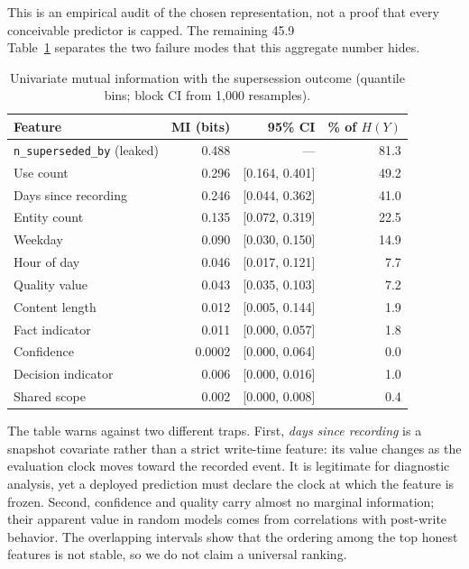 \documentclass[sigconf,nonacm]{acmart}
\begin{document}
This is an empirical audit of the chosen representation, not a proof that every conceivable predictor is capped. The remaining 45.9\\%
Table~\ref{tab:feature-mi} separates the two failure modes that this aggregate number hides.

\begin{table}[h]
\centering
\caption{Univariate mutual information with the supersession outcome (quantile bins; block CI from 1,000 resamples).}
\label{tab:feature-mi}
\begin{tabular}{lrrr}
\toprule
Feature & MI (bits) & 95\% CI & \% of $H(Y)$ \\
\midrule
\texttt{n\_superseded\_by} (leaked) & 0.488 & --- & 81.3 \\
Use count & 0.296 & [0.164, 0.401] & 49.2 \\
Days since recording & 0.246 & [0.044, 0.362] & 41.0 \\
Entity count & 0.135 & [0.072, 0.319] & 22.5 \\
Weekday & 0.090 & [0.030, 0.150] & 14.9 \\
Hour of day & 0.046 & [0.017, 0.121] & 7.7 \\
Quality value & 0.043 & [0.035, 0.103] & 7.2 \\
Content length & 0.012 & [0.005, 0.144] & 1.9 \\
Fact indicator & 0.011 & [0.000, 0.057] & 1.8 \\
Confidence & 0.0002 & [0.000, 0.064] & 0.0 \\
Decision indicator & 0.006 & [0.000, 0.016] & 1.0 \\
Shared scope & 0.002 & [0.000, 0.008] & 0.4 \\
\bottomrule
\end{tabular}
\end{table}

The table warns against two different traps. First, \emph{days since recording} is a snapshot covariate rather than a strict write-time feature: its value changes as the evaluation clock moves toward the recorded event. It is legitimate for diagnostic analysis, yet a deployed prediction must declare the clock at which the feature is frozen. Second, confidence and quality carry almost no marginal information; their apparent value in random models comes from correlations with post-write behavior. The overlapping intervals show that the ordering among the top honest features is not stable, so we do not claim a universal ranking.
\end{document}
